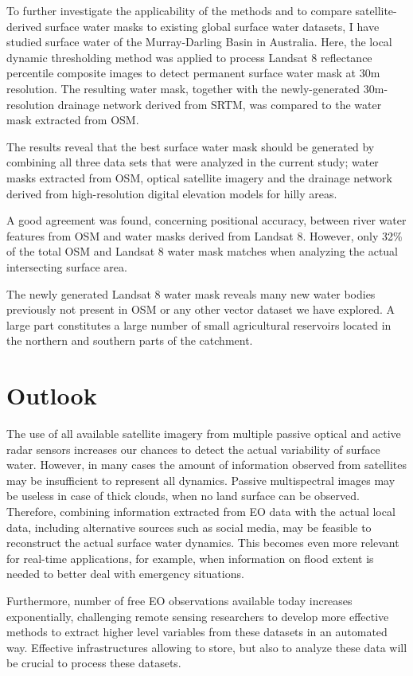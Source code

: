 To further investigate the applicability of the methods and to compare satellite-derived surface water masks to existing global surface water datasets, I have studied surface water of the Murray-Darling Basin in Australia. Here, the local dynamic thresholding method was applied to process Landsat 8 reflectance percentile composite images to detect permanent surface water mask at 30m resolution. The resulting water mask, together with the newly-generated 30m-resolution drainage network derived from SRTM, was compared to the water mask extracted from OSM.

The results reveal that the best surface water mask should be generated by combining all three data sets that were analyzed in the current study; water masks extracted from OSM, optical satellite imagery and the drainage network derived from high-resolution digital elevation models for hilly areas.

A good agreement was found, concerning positional accuracy, between river water features from OSM and water masks derived from Landsat 8. However, only 32\% of the total OSM and Landsat 8 water mask matches when analyzing the actual intersecting surface area.

The newly generated Landsat 8 water mask reveals many new water bodies previously not present in OSM or any other vector dataset we have explored. A large part constitutes a large number of small agricultural reservoirs located in the northern and southern parts of the catchment.

\section{Outlook}

The use of all available satellite imagery from multiple passive optical and active radar sensors increases our chances to detect the actual variability of surface water. However, in many cases the amount of information observed from satellites may be insufficient to represent all dynamics. Passive multispectral images may be useless in case of thick clouds, when no land surface can be observed. Therefore, combining information extracted from EO data with the actual local data, including alternative sources such as social media, may be feasible to reconstruct the actual surface water dynamics. This becomes even more relevant for real-time applications, for example, when information on flood extent is needed to better deal with emergency situations.

Furthermore, number of free EO observations available today increases exponentially, challenging remote sensing researchers to develop more effective methods to extract higher level variables from these datasets in an automated way. Effective infrastructures allowing to store, but also to analyze these data will be crucial to process these datasets.

